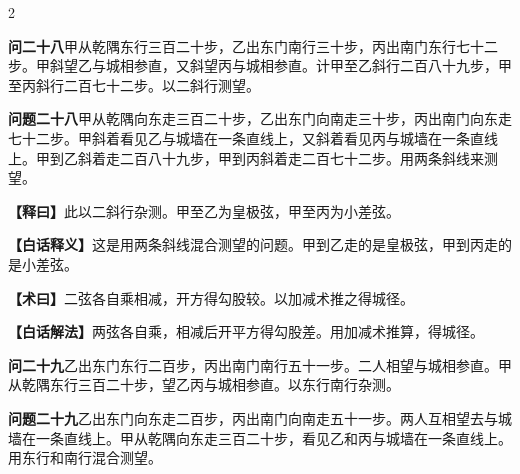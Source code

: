 \documentclass[11pt,a4paper]{article}
\newcommand{\WenQuestion}[1]{\textbf{\textcolor{classicalcolor}{#1}}}
\newcommand{\BaiQuestion}[1]{\textbf{\textcolor{moderncolor}{#1}}}
\newcommand{\WenExplain}{\textcolor{classicalcolor}{\textbf{【释曰】}}}
\newcommand{\BaiExplain}{\textcolor{moderncolor}{\textbf{【白话释义】}}}
\newcommand{\WenMethod}{\textcolor{classicalcolor}{\textbf{【术曰】}}}
\newcommand{\BaiMethod}{\textcolor{moderncolor}{\textbf{【白话解法】}}}
\begin{document}
\begin{paracol}{2}

\switchcolumn*
\begin{tcolorbox}[colback=red!3,colframe=red!30!black,boxrule=0.3pt]
\WenQuestion{问二十八}\quad 甲从乾隅东行三百二十步，乙出东门南行三十步，丙出南门东行七十二步。甲斜望乙与城相参直，又斜望丙与城相参直。计甲至乙斜行二百八十九步，甲至丙斜行二百七十二步。以二斜行测望。
\end{tcolorbox}
\switchcolumn
\begin{tcolorbox}[colback=blue!3,colframe=blue!30!black,boxrule=0.3pt]
\BaiQuestion{问题二十八}\quad 甲从乾隅向东走三百二十步，乙出东门向南走三十步，丙出南门向东走七十二步。甲斜着看见乙与城墙在一条直线上，又斜着看见丙与城墙在一条直线上。甲到乙斜着走二百八十九步，甲到丙斜着走二百七十二步。用两条斜线来测望。
\end{tcolorbox}

\switchcolumn*
\begin{tcolorbox}[colback=red!5,colframe=red!30!black,boxrule=0.3pt]
\WenExplain\quad 此以二斜行杂测。甲至乙为皇极弦，甲至丙为小差弦。
\end{tcolorbox}
\switchcolumn
\begin{tcolorbox}[colback=blue!5,colframe=blue!30!black,boxrule=0.3pt]
\BaiExplain\quad 这是用两条斜线混合测望的问题。甲到乙走的是皇极弦，甲到丙走的是小差弦。
\end{tcolorbox}

\switchcolumn*
\begin{tcolorbox}[colback=red!5,colframe=red!40!black,boxrule=0.3pt]
\WenMethod\quad 二弦各自乘相减，开方得勾股较。以加减术推之得城径。
\end{tcolorbox}
\switchcolumn
\begin{tcolorbox}[colback=blue!5,colframe=blue!40!black,boxrule=0.3pt]
\BaiMethod\quad 两弦各自乘，相减后开平方得勾股差。用加减术推算，得城径。
\end{tcolorbox}

\vspace{0.8em}

\switchcolumn*
\begin{tcolorbox}[colback=red!3,colframe=red!30!black,boxrule=0.3pt]
\WenQuestion{问二十九}\quad 乙出东门东行二百步，丙出南门南行五十一步。二人相望与城相参直。甲从乾隅东行三百二十步，望乙丙与城相参直。以东行南行杂测。
\end{tcolorbox}
\switchcolumn
\begin{tcolorbox}[colback=blue!3,colframe=blue!30!black,boxrule=0.3pt]
\BaiQuestion{问题二十九}\quad 乙出东门向东走二百步，丙出南门向南走五十一步。两人互相望去与城墙在一条直线上。甲从乾隅向东走三百二十步，看见乙和丙与城墙在一条直线上。用东行和南行混合测望。
\end{tcolorbox}


\end{paracol}
\end{document}
